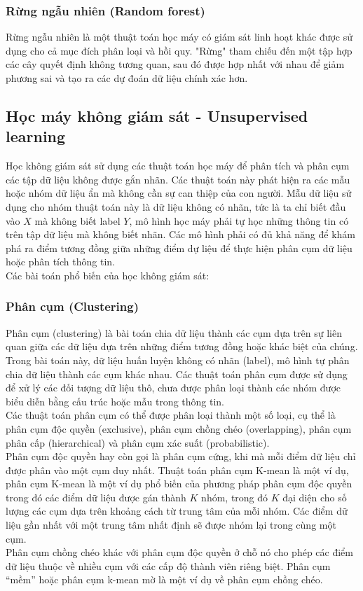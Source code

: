 \subsubsection{Rừng ngẫu nhiên (Random forest)}
Rừng ngẫu nhiên là một thuật toán học máy có giám sát linh hoạt khác được sử dụng cho cả mục đích phân loại và hồi quy. "Rừng" tham chiếu đến một tập hợp các cây quyết định không tương quan, sau đó được hợp nhất với nhau để giảm phương sai và tạo ra các dự đoán dữ liệu chính xác hơn.
\subsection{Học máy không giám sát - Unsupervised learning}
Học không giám sát sử dụng các thuật toán học máy để phân tích và phân cụm các tập dữ liệu không được gắn nhãn. Các thuật toán này phát hiện ra các mẫu hoặc nhóm dữ liệu ẩn mà không cần sự can thiệp của con người. Mẫu dữ liệu sử dụng cho nhóm thuật toán này là dữ liệu không có nhãn, tức là ta chỉ biết đầu vào $X$ mà không biết label $Y$, mô hình học máy phải tự học những thông tin có trên tập dữ liệu mà không biết nhãn. Các mô hình phải có đủ khả năng để khám phá ra điểm tương đồng giữa những điểm dự liệu để thực hiện phân cụm dữ liệu hoặc phân tích thông tin.\\
Các bài toán phổ biến của học không giám sát:
\subsubsection{Phân cụm (Clustering)}
Phân cụm (clustering) là bài toán chia dữ liệu thành các cụm dựa trên
sự liên quan giữa các dữ liệu dựa trên những điểm tương đồng hoặc khác biệt của chúng. Trong bài toán này, dữ liệu huấn luyện không có nhãn (label), mô hình tự phân chia dữ liệu thành các cụm khác nhau.  Các thuật toán phân cụm được sử dụng để xử lý các đối tượng dữ liệu thô, chưa được phân loại thành các nhóm được biểu diễn bằng cấu trúc hoặc mẫu trong thông tin.\\
Các thuật toán phân cụm có thể được phân loại thành một số loại, cụ thể là phân cụm độc quyền (exclusive), phân cụm chồng chéo (overlapping), phân cụm phân cấp (hierarchical) và phân cụm xác suất (probabilistic).\\
Phân cụm độc quyền hay còn gọi là phân cụm cứng, khi mà mỗi điểm dữ liệu chỉ được phân vào một cụm duy nhất. Thuật toán phân cụm K-mean là một ví dụ, phân cụm K-mean là một ví dụ phổ biến của phương pháp phân cụm độc quyền trong đó các điểm dữ liệu được gán thành $K$ nhóm, trong đó $K$ đại diện cho số lượng các cụm dựa trên khoảng cách từ trung tâm của mỗi nhóm. Các điểm dữ liệu gần nhất với một trung tâm nhất định sẽ được nhóm lại trong cùng một cụm. \\
Phân cụm chồng chéo khác với phân cụm độc quyền ở chỗ nó cho phép các điểm dữ liệu thuộc về nhiều cụm với các cấp độ thành viên riêng biệt. Phân cụm “mềm” hoặc phân cụm k-mean mờ là một ví dụ về phân cụm chồng chéo.

